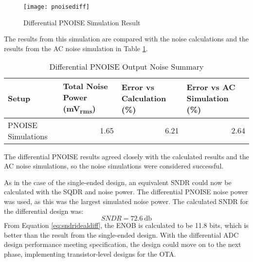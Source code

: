 \begin{figure}[htbp]
\centering
\texttt{[image: pnoisediff]}
\caption{Differential PNOISE Simulation Result} 
\label{fig:pnoisediff}
\end{figure}
The results from this simulation are compared with the noise calculations and the results from the AC noise simulation in Table \ref{tab:pnoisesummarydiff}. 
\begin{table}[htbp]
\begin{center}
\begin{tabularx}{\linewidth}{|l|X|X|X|}
\hline
Setup & Total Noise Power (\si{\milli\volt_{rms}}) & Error vs Calculation (\%) & Error vs AC Simulation (\%) \\ \hline
PNOISE Simulations & \multicolumn{1}{r|}{1.65} & \multicolumn{1}{r|}{6.21} & \multicolumn{1}{r|}{2.64} \\
\hline
\end{tabularx}
\end{center}
\caption{Differential PNOISE Output Noise Summary}
\label{tab:pnoisesummarydiff}
\end{table}
The differential PNOISE results agreed closely with the calculated results and the AC noise simulations, so the noise simulations were considered successful.

As in the case of the single-ended design, an equivalent SNDR could now be calculated with the SQDR and noise power. The differential PNOISE noise power was used, as this was the largest simulated noise power. The calculated SNDR for the differential design was:
\begin{equation}
\label{eq:sndridealdiff}
SNDR = \SI{72.6}{\decibel}
\end{equation}
From Equation \ref{eq:sndridealdiff}, the ENOB is calculated to be 11.8 bits, which is better than the result from the single-ended design. With the differential ADC design performance meeting specification, the design could move on to the next phase, implementing transistor-level designs for the OTA.